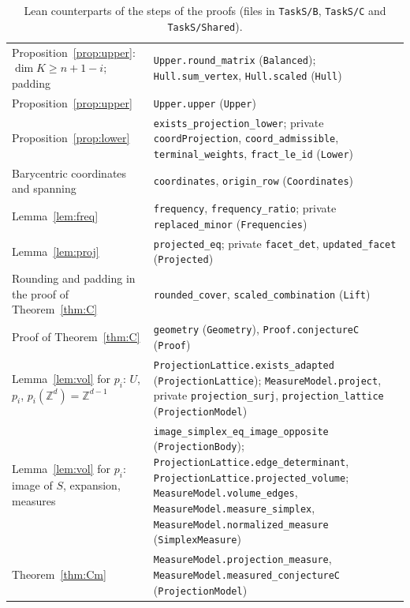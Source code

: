 \documentclass[11pt]{article}
\theoremstyle{definition}
\theoremstyle{remark}
\newcommand{\Z}{\mathbb Z}
\begin{document}
{\begin{table}[ht]
\begin{tabular}{@{}>{\raggedright\arraybackslash}p{}>{\raggedright\arraybackslash}p{}@{}}
Proposition~\ref{prop:upper}: $\dim K\ge n+1-i$; padding &
\texttt{Upper.round\_matrix} (\texttt{Balanced}); \texttt{Hull.sum\_vertex},
\texttt{Hull.scaled} (\texttt{Hull}) \\
Proposition~\ref{prop:upper} & \texttt{Upper.upper} (\texttt{Upper}) \\
Proposition~\ref{prop:lower} & \texttt{exists\_projection\_lower}; private
\texttt{coordProjection}, \texttt{coord\_admissible}, \texttt{terminal\_weights},
\texttt{fract\_le\_id} (\texttt{Lower}) \\
\hline
Barycentric coordinates and spanning & \texttt{coordinates}, \texttt{origin\_row}
(\texttt{Coordinates}) \\
Lemma~\ref{lem:freq} & \texttt{frequency}, \texttt{frequency\_ratio}; private
\texttt{replaced\_minor} (\texttt{Frequencies}) \\
Lemma~\ref{lem:proj} & \texttt{projected\_eq}; private \texttt{facet\_det},
\texttt{updated\_facet} (\texttt{Projected}) \\
Rounding and padding in the proof of Theorem~\ref{thm:C} &
\texttt{rounded\_cover}, \texttt{scaled\_combination} (\texttt{Lift}) \\
Proof of Theorem~\ref{thm:C} & \texttt{geometry} (\texttt{Geometry}),
\texttt{Proof.conjectureC} (\texttt{Proof}) \\
Lemma~\ref{lem:vol} for $p_i$: $U$, $p_i$, $p_i(\Z^d)=\Z^{d-1}$ &
\texttt{ProjectionLattice.exists\_adapted} (\texttt{ProjectionLattice});
\texttt{MeasureModel.project}, private \texttt{projection\_surj},
\texttt{projection\_lattice} (\texttt{ProjectionModel}) \\
Lemma~\ref{lem:vol} for $p_i$: image of $S$, expansion, measures &
\texttt{image\_simplex\_eq\_image\_opposite} (\texttt{ProjectionBody});
\texttt{ProjectionLattice.edge\_determinant},
\texttt{ProjectionLattice.projected\_volume};
\texttt{MeasureModel.volume\_edges}, \texttt{MeasureModel.measure\_simplex},
\texttt{MeasureModel.normalized\_measure} (\texttt{SimplexMeasure}) \\
Theorem~\ref{thm:Cm} & \texttt{MeasureModel.projection\_measure},
\texttt{MeasureModel.measured\_conjectureC} (\texttt{ProjectionModel}) \\
\hline
\end{tabular}
\caption{Lean counterparts of the steps of the proofs (files in
\texttt{TaskS/B}, \texttt{TaskS/C} and \texttt{TaskS/Shared}).}
\label{tab:lean}
\end{table}

}
\end{document}
